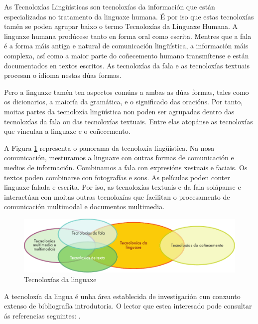 \begin{multicols}{2}

  As Tecnoloxías Lingüísticas son tecnoloxías da información que están especializadas no tratamento da linguaxe humana. É por iso que estas tecnoloxías tamén se poden agrupar baixo o termo Tecnoloxías da Linguaxe Humana. A linguaxe humana prodúcese tanto en forma oral como escrita. Mentres que a fala é a forma máis antiga e natural de comunicación lingüística, a información máis complexa, así como a maior parte do coñecemento humano transmítense e están documentados en textos escritos. As tecnoloxías da fala e as tecnoloxías textuais procesan o idioma nestas dúas formas. 
  
Pero a linguaxe tamén ten aspectos comúns a ambas as dúas formas, tales como os dicionarios, a maioría da gramática, e o significado das oracións. Por tanto, moitas partes da tecnoloxía lingüística non poden ser agrupadas dentro das tecnoloxías da fala ou das tecnoloxías textuais.  Entre elas atopánse as tecnoloxías que vinculan a linguaxe e o coñecemento. 

A Figura \ref{fig:ltincontext_ga} representa o panorama da tecnoloxía lingüística. Na nosa comunicación, mesturamos a linguaxe con outras formas de comunicación e medios de información. Combinamos a fala con expresións xestuais e faciais. Os textos poden combinarse con fotografías e sons. As películas poden conter linguaxe falada e escrita. Por iso, as tecnoloxías textuais e da fala solápanse e interactúan con moitas outras tecnoloxías que facilitan o procesamento de comunicación multimodal e documentos multimedia.

\begin{figure}[htb]
  \center
  \includegraphics[width=\textwidth]{../_media/galician/language_technologies}
  \caption{Tecnoloxías da linguaxe}
  \label{fig:ltincontext_ga}
\end{figure}

A tecnoloxía da lingua é unha área establecida de investigación cun conxunto extenso de bibliografía introdutoria. O lector que estea interesado pode consultar ás referencias seguintes:  \cite{carstensen-etal1,jurafsky-martin01, manning-schuetze1, lt-world1, lt-survey1}.


\end{multicols}
